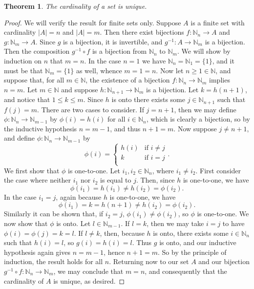 \documentclass[12pt]{article}
\theoremstyle{plain}
\newtheorem*{thm}{Theorem}
\begin{document}
\begin{thm}
The cardinality of a set is unique.
\end{thm}
\begin{proof}
We will verify the result for finite sets only. 
Suppose $A$ is a finite set with cardinality $\mid A\mid=n$ and $\mid A\mid=m$. Then there exist bijections $f:\mathbb{N}_n\rightarrow A$ and $g:\mathbb{N}_m\rightarrow A$. Since $g$ is a bijection, it is invertible, and $g^{-1}:A\rightarrow\mathbb{N}_m$ is a bijection. Then the composition $g^{-1}\circ f$ is a bijection from $\mathbb{N}_n$ to $\mathbb{N}_m$. We will show by induction on $n$ that $m=n$. In the case $n=1$ we have $\mathbb{N}_n=\mathbb{N}_1=\{1\}$, and it must be that $\mathbb{N}_m=\{1\}$ as well, whence $m=1=n$. Now let $n\geq 1\in\mathbb{N}$, and suppose that, for all $m\in\mathbb{N}$, the existence of a bijection $f:\mathbb{N}_n\rightarrow\mathbb{N}_m$ implies $n=m$. Let $m\in\mathbb{N}$ and suppose $h:\mathbb{N}_{n+1}\rightarrow\mathbb{N}_m$ is a bijection. Let $k=h(n+1)$, and notice that $1\leq k\leq m$. Since $h$ is onto there exists some $j\in\mathbb{N}_{n+1}$ such that $f(j)=m$. There are two cases to consider. If $j=n+1$, then we may define $\phi:\mathbb{N}_n\rightarrow\mathbb{N}_{m-1}$ by $\phi(i)=h(i)$ for all $i\in\mathbb{N}_n$, which is clearly a bijection, so by the inductive hypothesis $n=m-1$, and thus $n+1=m$. Now suppose $j\neq n+1$, and define $\phi:\mathbb{N}_n\rightarrow\mathbb{N}_{m-1}$ by
\begin{equation*}
\phi(i)=
\begin{cases}
h(i)&\text{if }i\neq j\\
k&\text{if }i=j\\
\end{cases}\text{.}
\end{equation*}
We first show that $\phi$ is one-to-one. Let $i_1,i_2\in\mathbb{N}_n$, where $i_1\neq i_2$. First consider the case where neither $i_1$ nor $i_2$ is equal to $j$. Then, since $h$ is one-to-one, we have
\begin{equation*}
\phi(i_1)=h(i_1)\neq h(i_2)=\phi(i_2)\text{.}
\end{equation*}
In the case $i_1=j$, again because $h$ is one-to-one, we have
\begin{equation*}
\phi(i_1)=k=h(n+1)\neq h(i_2)=\phi(i_2)\text{.}
\end{equation*}
Similarly it can be shown that, if $i_2=j$, $\phi(i_1)\neq \phi(i_2)$, so $\phi$ is one-to-one. We now show that $\phi$ is onto. Let $l\in\mathbb{N}_{m-1}$. If $l=k$, then we may take $i=j$ to have $\phi(i)=\phi(j)=k=l$. If $l\neq k$, then, because $h$ is onto, there exists some $i\in\mathbb{N}_{n}$ such that $h(i)=l$, so $g(i)=h(i)=l$. Thus $g$ is onto, and our inductive hypothesis again gives $n=m-1$, hence $n+1=m$. So by the principle of induction, the result holds for all $n$. Returning now to our set $A$ and our bijection $g^{-1}\circ f:\mathbb{N}_n\rightarrow\mathbb{N}_m$, we may conclude that $m=n$, and consequently that the cardinality of $A$ is unique, as desired.    
\end{proof}
\end{document}
